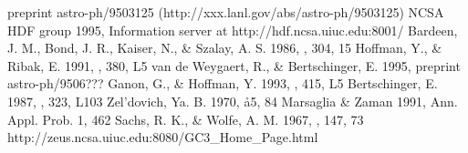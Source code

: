 \begin{thebibliography}{99}
    preprint astro-ph/9503125 (http://xxx.lanl.gov/abs/astro-ph/9503125)
 NCSA HDF group 1995, Information server at
    http://hdf.ncsa.uiuc.edu:8001/
 Bardeen, J. M., Bond, J. R., Kaiser, N., \& Szalay, A. S.
    1986, \apj, 304, 15
 Hoffman, Y., \& Ribak, E. 1991, \apj, 380, L5
 van de Weygaert, R., \& Bertschinger, E. 1995, preprint
    astro-ph/9506???
 Ganon, G., \& Hoffman, Y. 1993, \apj, 415, L5
 Bertschinger, E. 1987, \apj, 323, L103
 Zel'dovich, Ya. B. 1970, \aa 5, 84
 Marsaglia \& Zaman 1991, Ann. Appl. Prob. 1, 462
 Sachs, R. K., \& Wolfe, A. M. 1967, \apj, 147, 73
 http://zeus.ncsa.uiuc.edu:8080/GC3\_Home\_Page.html


\end{thebibliography}


